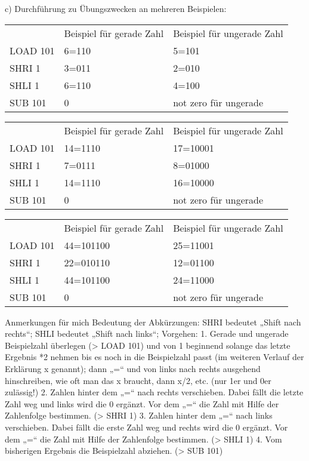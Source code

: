 \documentclass{lehramt-informatik-aufgabe}
\begin{document}
c) Durchführung zu Übungszwecken an mehreren Beispielen:

\begin{tabular}{lll}
         & Beispiel für gerade 			Zahl & Beispiel für ungerade 			Zahl \\
LOAD 101 & 6=110                       & 5=101                         \\
SHRI 1   & 3=011                       & 2=010                         \\
SHLI 1   & 6=110                       & 4=100                         \\
SUB 101  & 0                           & not zero 			für ungerade
\end{tabular}

\begin{tabular}{lll}
         & Beispiel für gerade 			Zahl & Beispiel für ungerade 			Zahl \\
LOAD 101 & 14=1110                     & 17=10001                      \\
SHRI 1   & 7=0111                      & 8=01000                       \\
SHLI 1   & 14=1110                     & 16=10000                      \\
SUB 101  & 0                           & not zero 			für ungerade
\end{tabular}

\begin{tabular}{lll}
         & Beispiel für gerade 			Zahl & Beispiel für ungerade 			Zahl \\
LOAD 101 & 44=101100                   & 25=11001                      \\
SHRI 1   & 22=010110                   & 12=01100                      \\
SHLI 1   & 44=101100                   & 24=11000                      \\
SUB 101  & 0                           & not zero 			für ungerade
\end{tabular}

Anmerkungen für mich
Bedeutung der Abkürzungen:
SHRI bedeutet „Shift nach rechts“; SHLI bedeutet „Shift nach links“;
Vorgehen:
1. Gerade und ungerade Beispielzahl überlegen (> LOAD 101) und von 1 beginnend solange das letzte Ergebnis *2 nehmen bis es noch in die Beispielzahl passt (im weiteren Verlauf der Erklärung x genannt); dann „=“ und von links nach rechts ausgehend hinschreiben, wie oft man das x braucht, dann x/2, etc. (nur 1er und 0er zulässig!)
2. Zahlen hinter dem „=“ nach rechts verschieben. Dabei fällt die letzte Zahl weg und links wird die 0 ergänzt. Vor dem „=“ die Zahl mit Hilfe der Zahlenfolge bestimmen. (> SHRI 1)
3. Zahlen hinter dem „=“ nach links verschieben. Dabei fällt die erste Zahl weg und rechts wird die 0 ergänzt. Vor dem „=“ die Zahl mit Hilfe der Zahlenfolge bestimmen. (> SHLI 1)
4. Vom bisherigen Ergebnis die Beispielzahl abziehen. (> SUB 101)
\end{document}
